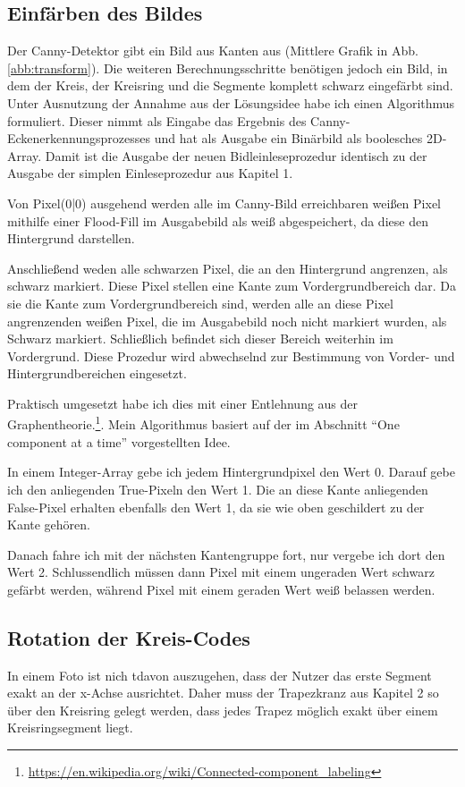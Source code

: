 \subsection{Einfärben des Bildes}
Der Canny-Detektor gibt ein Bild aus Kanten aus (Mittlere Grafik in Abb. \ref{abb:transform}). Die weiteren Berechnungsschritte benötigen jedoch ein Bild, in dem der Kreis, der Kreisring und die Segmente komplett schwarz eingefärbt sind. Unter Ausnutzung der Annahme aus der Lösungsidee habe ich einen Algorithmus formuliert.
Dieser nimmt als Eingabe das Ergebnis des Canny-Eckenerkennungsprozesses und hat als Ausgabe ein Binärbild als boolesches 2D-Array. Damit ist die Ausgabe der neuen Bidleinleseprozedur identisch zu der Ausgabe der simplen Einleseprozedur aus Kapitel 1.

Von Pixel(0|0) ausgehend werden alle im Canny-Bild erreichbaren weißen Pixel mithilfe einer Flood-Fill im Ausgabebild als weiß abgespeichert, da diese den Hintergrund darstellen.

Anschließend weden alle schwarzen Pixel, die an den Hintergrund angrenzen, als schwarz markiert. Diese Pixel stellen eine Kante zum Vordergrundbereich dar.
Da sie die Kante zum Vordergrundbereich sind, werden alle an diese Pixel angrenzenden weißen Pixel, die im Ausgabebild noch nicht markiert wurden, als Schwarz markiert. Schließlich befindet sich dieser Bereich weiterhin im Vordergrund.
Diese Prozedur wird abwechselnd zur Bestimmung von Vorder- und Hintergrundbereichen eingesetzt.

Praktisch umgesetzt habe ich dies mit einer Entlehnung aus der Graphentheorie.\footnote{\url{https://en.wikipedia.org/wiki/Connected-component_labeling}}. Mein Algorithmus basiert auf der im Abschnitt "`One component at a time"' vorgestellten Idee.

In einem Integer-Array gebe ich jedem Hintergrundpixel den Wert 0. Darauf gebe ich den anliegenden True-Pixeln den Wert 1. Die an diese Kante anliegenden False-Pixel erhalten ebenfalls den Wert 1, da sie wie oben geschildert zu der Kante gehören.

Danach fahre ich mit der nächsten Kantengruppe fort, nur vergebe ich dort den Wert 2. Schlussendlich müssen dann Pixel mit einem ungeraden Wert schwarz gefärbt werden, während Pixel mit einem geraden Wert weiß belassen werden.

\subsection {Rotation der Kreis-Codes}
In einem Foto ist nich tdavon auszugehen, dass der Nutzer das erste Segment exakt an der x-Achse ausrichtet. Daher muss der Trapezkranz aus Kapitel 2 so über den Kreisring gelegt werden, dass jedes Trapez möglich exakt über einem Kreisringsegment liegt. 

